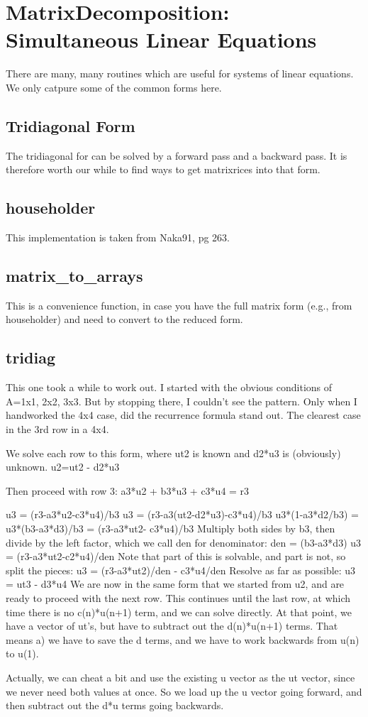\section{MatrixDecomposition: Simultaneous Linear Equations}
There are many, many routines which are useful for systems of
linear equations.  We only catpure some of the common forms here.

\subsection{Tridiagonal Form}
The tridiagonal for can be solved by a forward pass and a backward pass.
It is therefore worth our while to find ways to get matrixrices into that
form.  

\subsection*{householder}
This implementation is taken from Naka91, pg 263.

\subsection*{matrix\_to\_arrays}
This is a convenience function, in case you have the full matrix form
(e.g., from householder) and need to convert to the reduced form.

\subsection*{tridiag}
This one took a while to work out.  I started with
the obvious conditions of A=1x1, 2x2, 3x3.  But by stopping
there, I couldn't see the pattern.  Only when I handworked
the 4x4 case, did the recurrence formula stand out.  The
clearest case in the 3rd row in a 4x4.

We solve each row to this form, where ut2 is known and d2*u3
is (obviously) unknown.
     u2=ut2 - d2*u3

Then proceed with row 3:
     a3*u2 + b3*u3 + c3*u4 = r3
     
     u3 = (r3-a3*u2-c3*u4)/b3
     u3 = (r3-a3(ut2-d2*u3)-c3*u4)/b3
     u3*(1-a3*d2/b3) = u3*(b3-a3*d3)/b3 = (r3-a3*ut2-
     c3*u4)/b3
Multiply both sides by b3, then divide by the left factor,
which we call den for denominator:
     den = (b3-a3*d3)
     u3 = (r3-a3*ut2-c2*u4)/den
Note that part of this is solvable, and part is not, so
split the pieces:
     u3 = (r3-a3*ut2)/den - c3*u4/den
Resolve as far as possible:
     u3 = ut3 - d3*u4
We are now in the same form that we started from u2, and are
ready to proceed with the next row.  This continues until
the last row, at which time there is no c(n)*u(n+1) term,
and we can solve directly.  At that point, we have a vector
of ut's, but have to subtract out the d(n)*u(n+1) terms.
That means a) we have to save the d terms, and we have to
work backwards from u(n) to u(1).

Actually, we can cheat a bit and use the existing u vector
as the ut vector, since we never need both values at once.
So we load up the u vector going forward, and then subtract
out the d*u terms going backwards.

